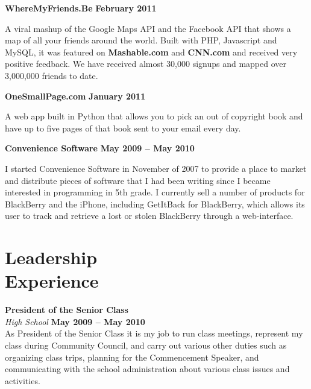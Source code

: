 \documentclass[margin,line]{resume}
\begin{document}
\begin{resume}
     \textbf{WhereMyFriends.Be} \hfill \textbf{February 2011}\vspace{-3mm}%
     
     A viral mashup of the Google Maps API and the Facebook API that shows a map of all your friends around the world. Built with PHP, Javascript and MySQL, it was featured on \textbf{Mashable.com} and \textbf{CNN.com} and received very positive feedback. We have received almost 30,000 signups and mapped over 3,000,000 friends to date.

    \textbf{OneSmallPage.com} \hfill \textbf{January 2011}\vspace{-3mm}%
     
     A web app built in Python that allows you to pick an out of copyright book and have up to five pages of that book sent to your email every day.


    \textbf{Convenience Software} \hfill \textbf{May 2009 -- May 2010}\vspace{-3mm}%
     
     I started Convenience Software in November of 2007 to provide a place to market and distribute pieces of software that I had been writing since I became interested in programming in 5th grade.  I currently sell a number of products for BlackBerry and the iPhone, including GetItBack for BlackBerry, which allows its user to track and retrieve a lost or stolen BlackBerry through a web-interface.


    \section{\mysidestyle Leadership\\Experience}

     \textbf{President of the Senior Class} \vspace{2mm}\\\vspace{1mm}%
     \textsl{High School} \hfill \textbf{May 2009 -- May 2010}\\
     As President of the Senior Class it is my job to run class meetings, represent my class during Community Council, and carry out various other duties such as organizing class trips, planning for the Commencement Speaker, and communicating with the school administration about various class issues and activities.


\end{resume}
\end{document}
